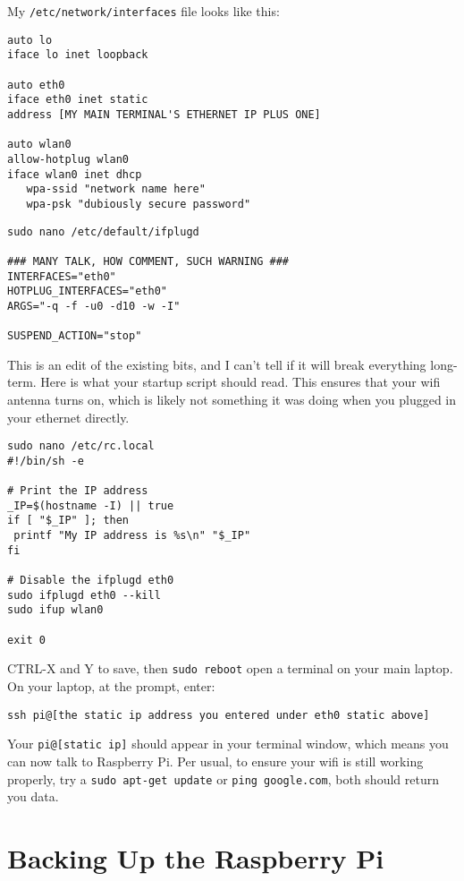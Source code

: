 My \texttt{/etc/network/interfaces} file looks like this:
\begin{lstlisting}
auto lo
iface lo inet loopback

auto eth0
iface eth0 inet static
address [MY MAIN TERMINAL'S ETHERNET IP PLUS ONE]

auto wlan0
allow-hotplug wlan0
iface wlan0 inet dhcp
   wpa-ssid "network name here"
   wpa-psk "dubiously secure password"
\end{lstlisting}
 

\begin{lstlisting}
sudo nano /etc/default/ifplugd

### MANY TALK, HOW COMMENT, SUCH WARNING ###
INTERFACES="eth0"
HOTPLUG_INTERFACES="eth0"
ARGS="-q -f -u0 -d10 -w -I"

SUSPEND_ACTION="stop"
\end{lstlisting}

This is an edit of the existing bits, and I can't tell if it will break everything long-term.
Here is what your startup script should read. This ensures that your wifi antenna turns on, which is likely not something it was doing when you plugged in your ethernet directly.

\begin{lstlisting}
sudo nano /etc/rc.local
#!/bin/sh -e

# Print the IP address
_IP=$(hostname -I) || true
if [ "$_IP" ]; then
 printf "My IP address is %s\n" "$_IP"
fi

# Disable the ifplugd eth0
sudo ifplugd eth0 --kill
sudo ifup wlan0

exit 0
\end{lstlisting}

CTRL-X and Y to save, then \texttt{sudo reboot} open a terminal on your main laptop. On your laptop, at the prompt, enter:
\begin{lstlisting}
ssh pi@[the static ip address you entered under eth0 static above]
\end{lstlisting}

Your \texttt{pi@[static ip]} should appear in your terminal window, which means you can now talk to Raspberry Pi.
Per usual, to ensure your wifi is still working properly, try a \texttt{sudo apt-get update} or \texttt{ping google.com}, both should return you data.

\section{Backing Up the Raspberry Pi}

